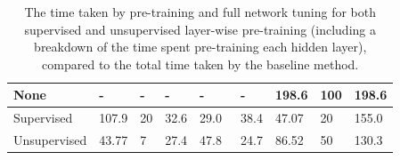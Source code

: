 \documentclass[a4paper, 11pt]{report}
\begin{document}
\begin{table}[ht]
\begin{tabular}{|l|l|l|l|l|l|l|l|l|}
        \hline
        None                                                                             & -                                                                                             & -                                                                                                                    & -                                                                         & -                                                                        & -                                                                        & 198.6                                                                                  & 100                                                                      & 198.6                                                                                  \\ 
        \hline
        Supervised                                                                       & 107.9                                                                                        & 20                                                                                                                   & 32.6                                                                      & 29.0                                                                     & 38.4                                                                     & 47.07                                                                                  & 20                                                                       & 155.0                                                                                  \\ 
        \hline
        Unsupervised                                                                     & 43.77                                                                                        & 7                                                                                                                    & 27.4                                                                      & 47.8~                                                                    & 24.7                                                                     & 86.52                                                                                  & 50                                                                       & 130.3                                                                                  \\
        \hline
        \end{tabular}
        \caption{\centering The time taken by pre-training and full network tuning for both supervised and unsupervised layer-wise pre-training (including a breakdown of the time spent pre-training each hidden layer), compared to the total time taken by the baseline method.}
        \label{table: progressive-efficiency}
    \end{table}
\end{document}
